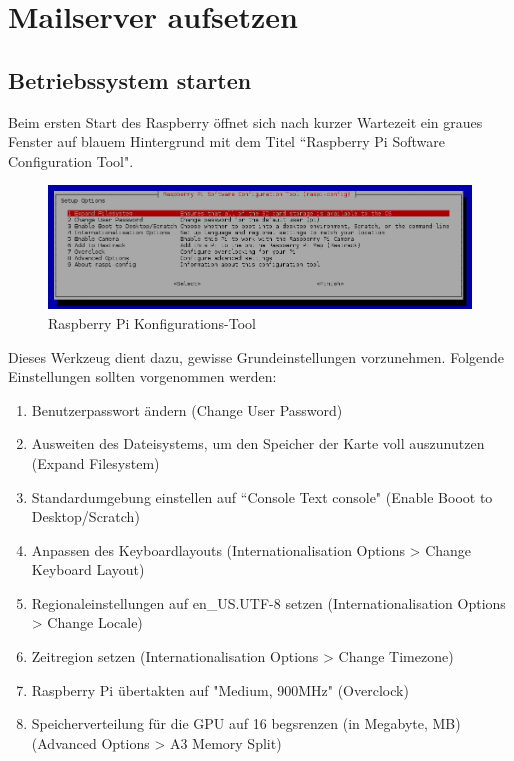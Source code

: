 \section{Mailserver aufsetzen}

\subsection{Betriebssystem starten}
Beim ersten Start des Raspberry öffnet sich nach kurzer Wartezeit ein graues Fenster auf blauem Hintergrund mit dem Titel ``Raspberry Pi Software Configuration Tool".

\begin{figure}[h]
\centering
\includegraphics[scale=0.5]{images/raspiconfig}
\caption{Raspberry Pi Konfigurations-Tool}
\end{figure}

Dieses Werkzeug dient dazu, gewisse Grundeinstellungen vorzunehmen. Folgende Einstellungen sollten vorgenommen werden:

\begin{enumerate}
\item Benutzerpasswort ändern (Change User Password)
\item Ausweiten des Dateisystems, um den Speicher der Karte voll auszunutzen (Expand Filesystem)
\item Standardumgebung einstellen auf ``Console Text console" (Enable Booot to Desktop/Scratch)
\item Anpassen des Keyboardlayouts (Internationalisation Options > Change Keyboard Layout)
\item Regionaleinstellungen auf en\_US.UTF-8 setzen (Internationalisation Options > Change Locale)
\item Zeitregion setzen (Internationalisation Options > Change Timezone)
\item Raspberry Pi übertakten auf "Medium, 900MHz" (Overclock)
\item Speicherverteilung für die GPU auf 16 begsrenzen (in Megabyte, MB) (Advanced Options > A3 Memory Split)
\end{enumerate}

